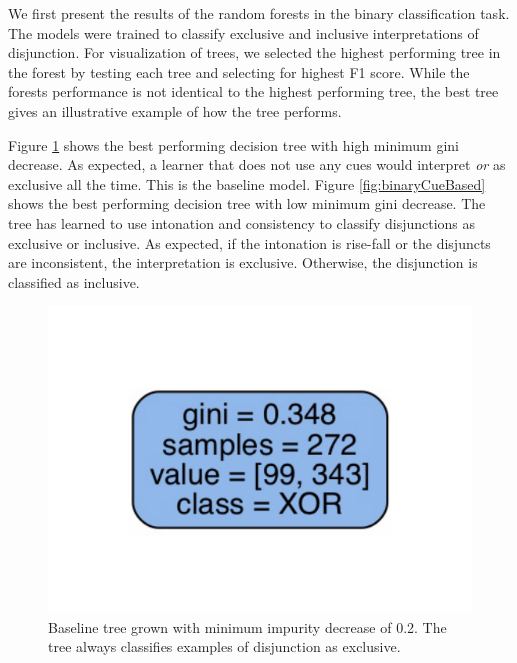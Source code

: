 \documentclass[floatsintext,man]{apa6}
\theoremstyle{definition}
\theoremstyle{definition}
\theoremstyle{definition}
\theoremstyle{remark}
\begin{document}
We first present the results of the random forests in the binary
classification task. The models were trained to classify exclusive and
inclusive interpretations of disjunction. For visualization of trees, we
selected the highest performing tree in the forest by testing each tree
and selecting for highest F1 score. While the forests performance is not
identical to the highest performing tree, the best tree gives an
illustrative example of how the tree performs.

Figure \ref{fig:binaryBaseline} shows the best performing decision tree
with high minimum gini decrease. As expected, a learner that does not
use any cues would interpret \emph{or} as exclusive all the time. This
is the baseline model. Figure \ref{fig:binaryCueBased} shows the best
performing decision tree with low minimum gini decrease. The tree has
learned to use intonation and consistency to classify disjunctions as
exclusive or inclusive. As expected, if the intonation is rise-fall or
the disjuncts are inconsistent, the interpretation is exclusive.
Otherwise, the disjunction is classified as inclusive.

\begin{figure}
\centering
\includegraphics{figs/binaryBaseline-1.pdf}
\caption{\label{fig:binaryBaseline}Baseline tree grown with minimum impurity
decrease of 0.2. The tree always classifies examples of disjunction as
exclusive.}
\end{figure}
\end{document}
